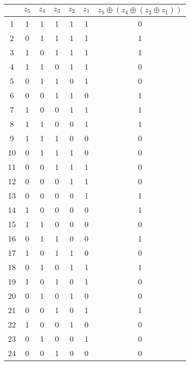 \begin{table}[h!]
    \centering
    \setlength{\tabcolsep}{0.5em}
    \begin{tabular}{|c|c|c|c|c|c|c|}
        \hline
        \textbf{} & \textbf{$z_5$} & \textbf{$z_4$} & \textbf{$z_3$} & \textbf{$z_2$} & \textbf{$z_1$} & \textbf{$z_5 \oplus (z_4 \oplus (z_2 \oplus z_1))$} \\
        \hline
        1 &  1 & 1 & 1 & 1 & 1 & 0 \\
        \hline
        2 &  0 & 1 & 1 & 1 & 1 & 1 \\
        \hline
        3 &  1 & 0 & 1 & 1 & 1 & 1 \\
        \hline
        4 &  1 & 1 & 0 & 1 & 1 & 0 \\
        \hline
        5 &  0 & 1 & 1 & 0 & 1 & 0 \\
        \hline
        6 &  0 & 0 & 1 & 1 & 0 & 1 \\
        \hline
        7 &  1 & 0 & 0 & 1 & 1 & 1 \\
        \hline
        8 &  1 & 1 & 0 & 0 & 1 & 1 \\
        \hline
        9 &  1 & 1 & 1 & 0 & 0 & 0 \\
        \hline
        10 &  0 & 1 & 1 & 1 & 0 & 0 \\
        \hline
        11 &  0 & 0 & 1 & 1 & 1 & 0 \\
        \hline
        12 &  0 & 0 & 0 & 1 & 1 & 0 \\
        \hline
        13 &  0 & 0 & 0 & 0 & 1 & 1 \\
        \hline
        14 &  1 & 0 & 0 & 0 & 0 & 1 \\
        \hline
        15 &  1 & 1 & 0 & 0 & 0 & 0\\
        \hline
        16 &  0 & 1 & 1 & 0 & 0 & 1 \\
        \hline
        17 &  1 & 0 & 1 & 1 & 0 & 0 \\
        \hline
        18 &  0 & 1 & 0 & 1 & 1 & 1 \\
        \hline
        19 &  1 & 0 & 1 & 0 & 1 & 0 \\
        \hline
        20 &  0 & 1 & 0 & 1 & 0 & 0 \\
        \hline
        21 &  0 & 0 & 1 & 0 & 1 & 1 \\
        \hline
        22 &  1 & 0 & 0 & 1 & 0 & 0  \\
        \hline
        23 &  0 & 1 & 0 & 0 & 1 & 0  \\
        \hline
        24 &  0 &  0 & 1 & 0 & 0 & 0  \\

\end{tabular}
\end{table}
